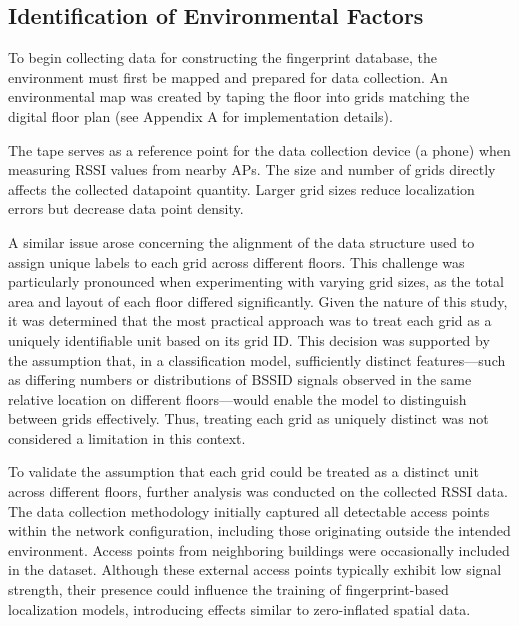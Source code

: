 \documentclass[runningheads]{llncs}
\begin{document}
\subsection{Identification of Environmental Factors}
To begin collecting data for constructing the fingerprint database, the environment must first be mapped and prepared for data collection. An environmental map was created by taping the floor into grids matching the digital floor plan (see Appendix A for implementation details). 

The tape serves as a reference point for the data collection device (a phone) when measuring RSSI values from nearby APs. The size and number of grids directly affects the collected datapoint quantity. Larger grid sizes reduce localization errors but decrease data point density.

A similar issue arose concerning the alignment of the data structure used to assign unique labels to each grid across different floors. This challenge was particularly pronounced when experimenting with varying grid sizes, as the total area and layout of each floor differed significantly. Given the nature of this study, it was determined that the most practical approach was to treat each grid as a uniquely identifiable unit based on its grid ID. This decision was supported by the assumption that, in a classification model, sufficiently distinct features—such as differing numbers or distributions of BSSID signals observed in the same relative location on different floors—would enable the model to distinguish between grids effectively. Thus, treating each grid as uniquely distinct was not considered a limitation in this context.

To validate the assumption that each grid could be treated as a distinct unit across different floors, further analysis was conducted on the collected RSSI data. The data collection methodology initially captured all detectable access points within the network configuration, including those originating outside the intended environment. Access points from neighboring buildings were occasionally included in the dataset. Although these external access points typically exhibit low signal strength, their presence could influence the training of fingerprint-based localization models, introducing effects similar to zero-inflated spatial data.
\end{document}
